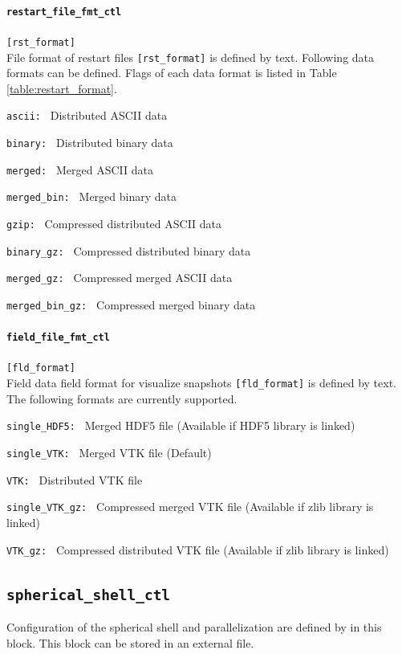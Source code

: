 \paragraph{\tt restart\_file\_fmt\_ctl}
\label{href_t:restart_file_fmt_ctl}
\verb|[rst_format]| \\
File format of restart files \verb|[rst_format]| is defined by text. Following data formats can be defined. Flags of each data format is listed in Table \ref{table:restart_format}.
%
\begin{description}
\item{\tt ascii: }   Distributed ASCII data
\item{\tt binary: }  Distributed binary data
\item{\tt merged: }  Merged ASCII data
\item{\tt merged\_bin: }   Merged binary data
\item{\tt gzip: }            Compressed distributed ASCII data
\item{\tt binary\_gz: }      Compressed distributed binary data
\item{\tt merged\_gz: }      Compressed merged ASCII data
\item{\tt merged\_bin\_gz: } Compressed merged binary data
\end{description}
%

\paragraph{\tt field\_file\_fmt\_ctl}
\label{href_t:field_file_fmt_ctl}
\verb|[fld_format]| \\
Field data field format for visualize snapshots \verb|[fld_format]| is defined by text. The following formats are currently supported.
%
\begin{description}
\item{\tt single\_HDF5: }  Merged HDF5 file (Available if HDF5 library is linked)
\item{\tt single\_VTK: }   Merged VTK file (Default)
\item{\tt VTK: }           Distributed VTK file
\item{\tt single\_VTK\_gz: }   Compressed merged VTK file (Available if zlib library is linked)
\item{\tt VTK\_gz: }           Compressed distributed VTK file (Available if zlib library is linked)
\end{description}
%
%
%
%

\subsection{\tt spherical\_shell\_ctl}
\label{href_t:spherical_shell_ctl}
Configuration of the spherical shell and parallelization are defined by in this block. This block can be stored in an external file.
%

